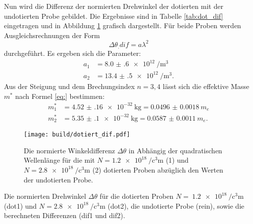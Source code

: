 Nun wird die Differenz der normierten Drehwinkel der dotierten mit der undotierten Probe gebildet. Die Ergebnisse sind in Tabelle \ref{tab:dot_dif} eingetragen und in Abbildung \ref{fig:dot_dif} grafisch dargestellt.
Für beide Proben werden Ausgleichsrechnungen der Form
\[
\Delta\theta_.{dif}=a\lambda^2
\] 
durchgeführt.
Es ergeben sich die Parameter:
\begin{align*}
a_1 &= \SI{8.0(6)e12}{\per\cubic\metre}\\
a_2 &= \SI{13.4(5)e12}{\per\cubic\metre}\text{.}
\end{align*}
Aus der Steigung und dem Brechungsindex $n=3,4$ \cite{} lässt sich die effektive Masse $m^*$ nach Formel \eqref{eq:} bestimmen:
\begin{align*}
m^*_1 &= \SI{4.52(16)e-32}{\kilogram} = \SI{0.0496(18)}{m_e}\\
m^*_2 &= \SI{5.35(10)e-32}{\kilogram} = \SI{0.0587(11)}{m_e}\text{.}
\end{align*}

\begin{figure}
	\centering
	\texttt{[image: build/dotiert\_dif.pdf]}
	\caption{Die normierte Winkeldifferenz $\Delta\theta$ in Abhängig der quadratischen Wellenlänge für die mit $N=\SI{1.2e18}{\per\cubic\centi\metre}$ (1) und $N=\SI{2.8e18}{\per\cubic\centi\metre}$ (2) dotierten Proben abzüglich den Werten der undotierten Probe.}
	\label{fig:dot_dif}
\end{figure}

\begin{table}
	\centering
	\caption{Die normierten Drehwinkel $\Delta\theta$ für die dotierten Proben $N=~\SI{1.2e18}{\per\cubic\centi\metre}$ (dot1) und $N=\SI{2.8e18}{\per\cubic\centi\metre}$ (dot2), die undotierte Probe (rein), sowie die berechneten Differenzen (dif1 und dif2).}
	
	\label{tab:dot_dif}
\end{table}